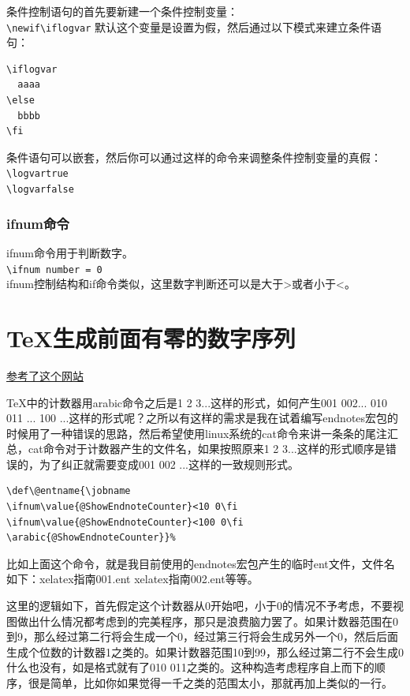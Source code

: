 \documentclass[11pt,oneside]{book}
\begin{document}
条件控制语句的首先要新建一个条件控制变量：\\
\verb+\newif\iflogvar+
默认这个变量是设置为假，然后通过以下模式来建立条件语句：
\begin{Verbatim}
\iflogvar
  aaaa
\else
  bbbb
\fi
\end{Verbatim}
条件语句可以嵌套，然后你可以通过这样的命令来调整条件控制变量的真假：\\
\verb+\logvartrue+\\
\verb+\logvarfalse+

\subsubsection{ifnum命令}
ifnum命令用于判断数字。\\
\verb+\ifnum number = 0+\\
ifnum控制结构和if命令类似，这里数字判断还可以是大于>或者小于<。

\section{TeX生成前面有零的数字序列}
\href{http://tex.stackexchange.com/questions/30930/how-to-output-a-counter-with-leading-zeros}{参考了这个网站}

TeX中的计数器用arabic命令之后是1 2 3...这样的形式，如何产生001 002... 010 011 ... 100 ...这样的形式呢？之所以有这样的需求是我在试着编写endnotes宏包的时候用了一种错误的思路，然后希望使用linux系统的cat命令来讲一条条的尾注汇总，cat命令对于计数器产生的文件名，如果按照原来1 2 3...这样的形式顺序是错误的，为了纠正就需要变成001  002 ...这样的一致规则形式。

\begin{Verbatim}
\def\@entname{\jobname
\ifnum\value{@ShowEndnoteCounter}<10 0\fi
\ifnum\value{@ShowEndnoteCounter}<100 0\fi
\arabic{@ShowEndnoteCounter}}%
\end{Verbatim}

比如上面这个命令，就是我目前使用的endnotes宏包产生的临时ent文件，文件名如下：xelatex指南001.ent xelatex指南002.ent等等。

这里的逻辑如下，首先假定这个计数器从0开始吧，小于0的情况不予考虑，不要视图做出什么情况都考虑到的完美程序，那只是浪费脑力罢了。如果计数器范围在0到9，那么经过第二行将会生成一个0，经过第三行将会生成另外一个0，然后后面生成个位数的计数器1之类的。如果计数器范围10到99，那么经过第二行不会生成0什么也没有，如是格式就有了010 011之类的。这种构造考虑程序自上而下的顺序，很是简单，比如你如果觉得一千之类的范围太小，那就再加上类似的一行。
\end{document}
